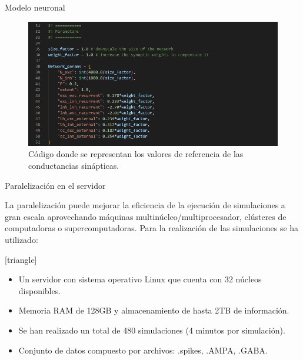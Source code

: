 \documentclass{beamer}
\begin{document}
\begin{frame}{Modelo neuronal}
\begin{figure}
      \centering
      \includegraphics[scale=0.6]{memoria/images/Código parámetros.png}
      \caption{Código donde se representan los valores de referencia de las conductancias sinápticas.}
\end{figure}
\end{frame}

\begin{frame}{Paralelización en el servidor}

La paralelización puede mejorar la eficiencia de la ejecución de simulaciones a gran
escala aprovechando máquinas multinúcleo/multiprocesador, clústeres de computadoras
o supercomputadoras. Para la realización de las simulaciones se ha utilizado:

\vfill
\pause
{}[triangle]
    \begin{itemize}
        \item Un servidor con sistema operativo Linux que cuenta con 32 núcleos disponibles.
        \vspace{2mm}
        \pause
        \item Memoria RAM de 128GB y almacenamiento de hasta 2TB de información.
        \vspace{2mm}
        \pause
        \item Se han realizado un total de 480 simulaciones (4 minutos por simulación).
        \vspace{2mm}  
        \pause
        \item Conjunto de datos compuesto por archivos: .spikes, .AMPA, .GABA.
        \vspace{2mm} 
    \end{itemize}    

\end{frame}
\end{document}
